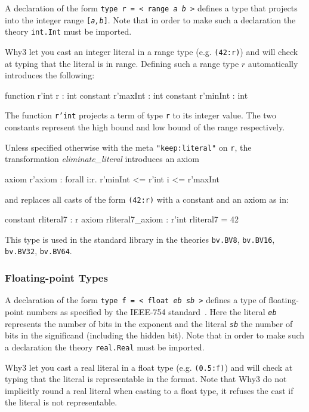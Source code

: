 A declaration of the form \texttt{type r = < range \textit{a b} >}
defines a type that projects into the integer range
\texttt{[\textit{a,b}]}. Note that in order to make such a declaration
the theory \texttt{int.Int} must be imported.

Why3 let you cast an integer literal in a range type
(e.g. \texttt{(42:r)}) and will check at typing that the literal is in
range. Defining such a range type $r$ automatically introduces the
following:
\begin{whycode}
  function  r'int r : int
  constant  r'maxInt : int
  constant  r'minInt : int
\end{whycode}
The function \texttt{r'int} projects a term of type \texttt{r} to its
integer value. The two constants represent the high bound and low
bound of the range respectively.

Unless specified otherwise with the meta \texttt{"keep:literal"} on
\texttt{r}, the transformation \emph{eliminate\_literal} introduces an
axiom
\begin{whycode}
axiom r'axiom : forall i:r. r'minInt <= r'int i <= r'maxInt
\end{whycode}
and replaces all casts of the form \texttt{(42:r)} with a constant and
an axiom as in:
\begin{whycode}
constant rliteral7 : r
axiom rliteral7_axiom : r'int rliteral7 = 42
\end{whycode}

This type is used in the standard library in the theories
\texttt{bv.BV8}, \texttt{bv.BV16}, \texttt{bv.BV32}, \texttt{bv.BV64}.


\subsubsection{Floating-point Types}

A declaration of the form \texttt{type f = < float \textit{eb sb} >}
defines a type of floating-point numbers as specified by the IEEE-754
standard~\cite{ieee754}. Here the literal \texttt{\textit{eb}}
represents the number of bits in the exponent and the literal
\texttt{\textit{sb}} the number of bits in the significand (including
the hidden bit). Note that in order to make such a declaration the
theory \texttt{real.Real} must be imported.

Why3 let you cast a real literal in a float type
(e.g. \texttt{(0.5:f)}) and will check at typing that the literal is
representable in the format. Note that Why3 do not implicitly round a
real literal when casting to a float type, it refuses the cast if the
literal is not representable.

